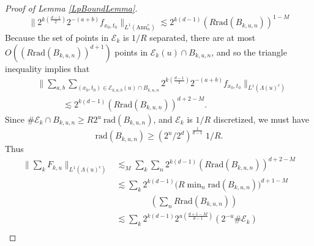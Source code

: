 \begin{proof}[Proof of Lemma \ref{LpBoundLemma}]
\begin{equation}
    \| 2^{k \left( \frac{d-1}{2} \right)} 2^{-(a+b)} f_{x_0,t_0} \|_{L^1(\text{Ann}_n^c)} \lesssim 2^{k(d-1)} (R \text{rad}(B_{k,u,n}))^{1 - M}
\end{equation}
%
%
% 
%
Because the set of points in $\mathcal{E}_k$ is $1/R$ separated, there are at most $O( (R \text{rad}(B_{k,u,n}))^{d+1} )$ points in $\mathcal{E}_k(u) \cap B_{k,u,n}$, and so the triangle inequality implies that
\begin{equation}
\begin{split}
    &\Big\| \sum\nolimits_{a,b} \sum\nolimits_{(x_0,t_0) \in \mathcal{E}_{k,a,b}(u) \cap B_{k,u,n}} 2^{k \left( \frac{d-1}{2} \right)} 2^{-(a+b)} f_{x_0,t_0} \Big\|_{L^1(\Lambda(u)^c)}\\
    &\quad\quad\quad \lesssim 2^{k (d - 1)} (R \text{rad}(B_{k,u,n}))^{d + 2 - M}.
\end{split}
\end{equation}
%
Since $\# \mathcal{E}_k \cap B_{k,u,n} \geq R 2^{u}\ \text{rad}(B_{k,u,n})$, and $\mathcal{E}_k$ is $1/R$ discretized, we must have
%
\begin{equation}
    \text{rad}(B_{k,u,n}) \geq (2^u / 2^d)^{\frac{1}{d-1}}\; 1/R.
\end{equation}
%
Thus
%
%
\begin{equation}
\begin{split}
    \Big\| \sum\nolimits_k F_{k,u} \Big\|_{L^1(\Lambda(u)^c)} &\lesssim_M \sum\nolimits_k \sum\nolimits_n 2^{k (d-1)} (R \text{rad}(B_{k,u,n}))^{d + 2 - M}\\
    &\lesssim \sum\nolimits_k 2^{k(d-1)} \Big( R \min\nolimits_n \text{rad}(B_{k,u,n}) \Big)^{d + 1 - M}\\
    &\quad\quad\quad\quad \left( \sum\nolimits_n R \text{rad}(B_{k,u,n}) \right) \\
    &\lesssim \sum\nolimits_k 2^{k (d-1)} 2^{u \left( \frac{d+1-M}{d-1} \right)} \left( 2^{-u} \# \mathcal{E}_k \right)\\

\end{split}
\end{equation}
\end{proof}
